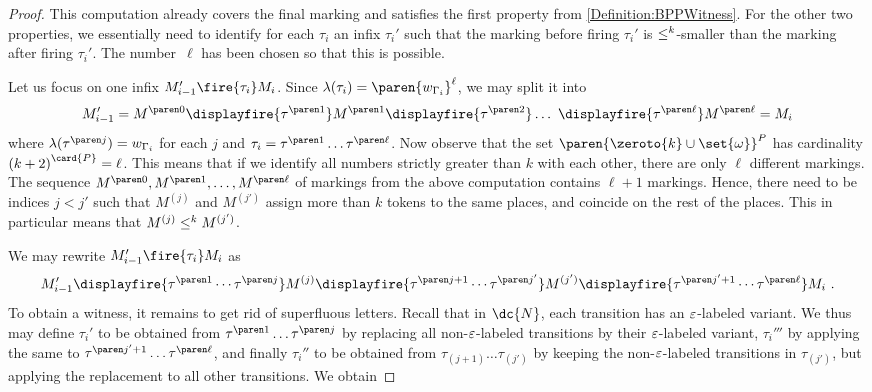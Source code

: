 \documentclass[../../diss.tex]{subfiles}
\begin{document}
\begin{proof}
    This computation already covers the final marking and satisfies the first property from \cref{Definition:BPPWitness}.
    For the other two properties, we essentially need to identify for each $\tau_i$ an infix $\tau_i'$ such that the marking before firing $\tau_i'$ is $\leq^k$-smaller than the marking after firing $\tau_i'$.
    The number~$\ell$ has been chosen so that this is possible.

    Let us focus on one infix $M_{i-1}' \fire{\tau_{i}} M_i$.
    Since $\lambda(\tau_i) = \paren{w_{\Gamma_i}}^{\ell}$, we may split it into
    \[
        M_{i-1}'
        = \itr{M}{0}
        \displayfire{ \itr{\tau}{1} }
        \itr{M}{1}
        \displayfire{ \itr{\tau}{2} }
        \ldots \
        \displayfire{ \itr{\tau}{\ell} }
        \itr{M}{\ell}
        = M_i
    \]
    where $\lambda( \itr{\tau}{j} ) = w_{\Gamma_i}$ for each $j$ and $\tau_i = \itr{\tau}{1} \ldots \itr{\tau}{\ell}$.
    Now observe that the set $\paren{\zeroto{k} \cup \set{\omega}}^{P}$ has cardinality ${(k+2)}^{\card{P}}=\ell$.
    This means that if we identify all numbers strictly greater than $k$ with each other, there are only $\ell$ different markings.
    The sequence $\itr{M}{0}, \itr{M}{1}, \ldots, \itr{M}{\ell}$ of markings from the above computation contains $\ell+1$ markings.
    Hence, there need to be indices $j < j'$ such that $M^{(j)}$ and $M^{(j')}$ assign more than $k$ tokens to the same places, and coincide on the rest of the places.
    This in particular means that $M^{(j)} \leq^k M^{(j')}$.

    We may rewrite $M_{i-1}' \fire{\tau_{i}} M_i$ as
    \[
        M_{i-1}'
        \displayfire{ \itr{\tau}{1} \cdots \itr{\tau}{j} }
        M^{(j)}
        \displayfire{ \itr{\tau}{j+1} \cdots \itr{\tau}{j'} }
        M^{(j')}
        \displayfire{ \itr{\tau}{j'+1} \cdots \itr{\tau}{\ell} }
        M_i
        \ .
    \]
    To obtain a witness, it remains to get rid of superfluous letters.
    Recall that in $\dc{N}$, each transition has an $\varepsilon$-labeled variant.
    We thus may define $\tau_i'$ to be obtained from $\itr{\tau}{1} \ldots \itr{\tau}{j}$ by replacing all non-$\varepsilon$-labeled transitions by their $\varepsilon$-labeled variant, $\tau_i'''$ by applying the same to $\itr{\tau}{j'+1} \ldots \itr{\tau}{\ell}$, and finally $\tau_i''$ to be obtained from $\tau_{(j+1)} \ldots \tau_{(j')}$ by keeping the non-$\varepsilon$-labeled transitions in $\tau_{(j')}$, but applying the replacement to all other transitions.
    We obtain \nb{$\lambda(\tau_i') = \lambda(\tau_i''') = \eps$, $\lambda(\tau_i'') = w_{\Gamma_i}$.}


\end{proof}
\end{document}
